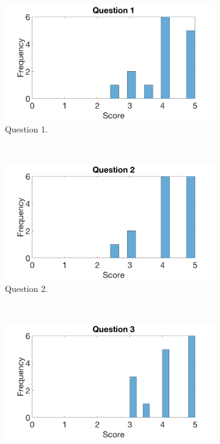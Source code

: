 \documentclass[main.tex]{subfiles}
\begin{document}
\begin{figure}[H]
	\captionsetup[subfigure]{position=b}
        \centering
        \begin{subfigure}{.47\textwidth}
                \includegraphics[width=\textwidth]{pics/q1}
                \caption{Question 1.}
                \label{fig:survey1}
        \end{subfigure}
        ~
		\begin{subfigure}{.47\textwidth}
                \includegraphics[width=\textwidth]{pics/q2}
                \caption{Question 2.}
                \label{fig:survey2}
        \end{subfigure}
		\\
		\begin{subfigure}{.47\textwidth}
				\includegraphics[width=\textwidth]{pics/q3}

\end{subfigure}
\end{figure}
\end{document}
